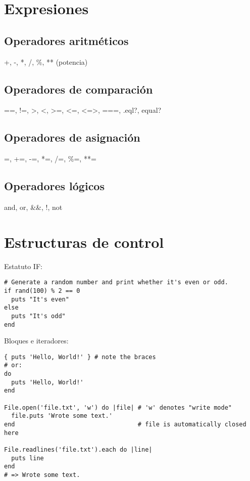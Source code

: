 \documentclass{IEEEtran}
\begin{document}
\section{Expresiones}
\subsection{Operadores aritm\'eticos}
+, -, *, /, \%, ** (potencia)

\subsection{Operadores de comparaci\'on}
==, !=, >, <, >=, <=, <=>, ===, .eql?, equal?

\subsection{Operadores de asignaci\'on}
=, +=, -=, *=, /=, \%=, **=

\subsection{Operadores l\'ogicos}
and, or, \&\&, !, not

\section{Estructuras de control}
Estatuto IF:
\begin{lstlisting}
# Generate a random number and print whether it's even or odd.
if rand(100) % 2 == 0
  puts "It's even"
else
  puts "It's odd"
end
\end{lstlisting}

Bloques e iteradores:
\begin{lstlisting}
{ puts 'Hello, World!' } # note the braces
# or:
do
  puts 'Hello, World!'
end

File.open('file.txt', 'w') do |file| # 'w' denotes "write mode"
  file.puts 'Wrote some text.'
end                                  # file is automatically closed here

File.readlines('file.txt').each do |line|
  puts line
end
# => Wrote some text.
\end{lstlisting}
\end{document}

